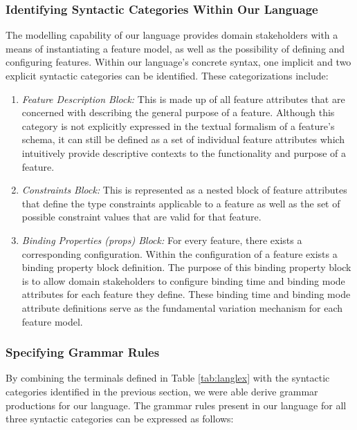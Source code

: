 \documentclass[conference]{IEEEtran}
\begin{document}
\subsubsection{Identifying Syntactic Categories Within Our Language}
The modelling capability of our language provides domain stakeholders with a means of instantiating a feature model, as well as the possibility of defining and configuring features. Within our language's concrete syntax, one implicit and two explicit syntactic categories can be identified. These categorizations include:
\begin{enumerate}
    \item \textit{Feature Description Block:} This is made up of all feature attributes that are concerned with describing the general purpose of a feature. Although this category is not explicitly expressed in the textual formalism of a feature's schema, it can still be defined as a set of individual feature attributes which intuitively provide descriptive contexts to the functionality and purpose of a feature.
    \item \textit{Constraints Block:} This is represented as a nested block of feature attributes that define the type constraints applicable to a feature as well as the set of possible constraint values that are valid for that feature.
    \item \textit{Binding Properties (props) Block:} For every feature, there exists a corresponding configuration. Within the configuration of a feature exists a binding property block definition. The purpose of this binding property block is to allow domain stakeholders to configure binding time and binding mode attributes for each feature they define. These binding time and binding mode attribute definitions serve as the fundamental variation mechanism for each feature model.
\end{enumerate}
 
\subsubsection{Specifying Grammar Rules} By combining the terminals defined in Table \ref{tab:langlex} with the syntactic categories identified in the previous section, we were able derive grammar productions for our language. The grammar rules present in our language for all three syntactic categories can be expressed as follows:\\
\end{document}
